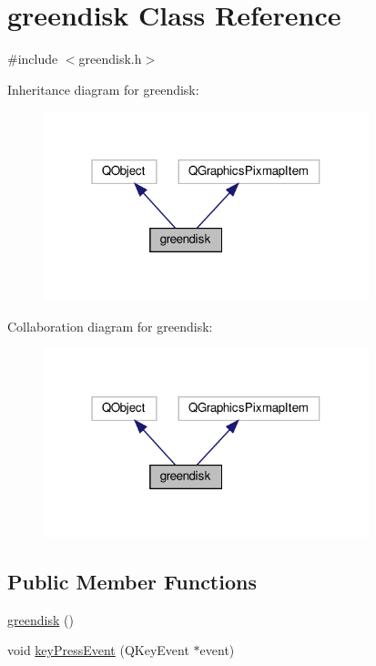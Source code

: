 \hypertarget{classgreendisk}{}\section{greendisk Class Reference}
\label{classgreendisk}


{\ttfamily \#include $<$greendisk.\+h$>$}



Inheritance diagram for greendisk\+:
\nopagebreak
\begin{figure}[H]
\begin{center}
\leavevmode
\includegraphics[width=268pt]{classgreendisk__inherit__graph}
\end{center}
\end{figure}


Collaboration diagram for greendisk\+:
\nopagebreak
\begin{figure}[H]
\begin{center}
\leavevmode
\includegraphics[width=268pt]{classgreendisk__coll__graph}
\end{center}
\end{figure}
\subsection*{Public Member Functions}
\begin{DoxyCompactItemize}
\item 
\hyperlink{classgreendisk_a7b9300f93e1d6ec27bcd102b48d9d84d}{greendisk} ()
\item 
void \hyperlink{classgreendisk_a1764cd43a91d49bc95a7420122c33ed8}{key\+Press\+Event} (Q\+Key\+Event $\ast$event)
\end{DoxyCompactItemize}


